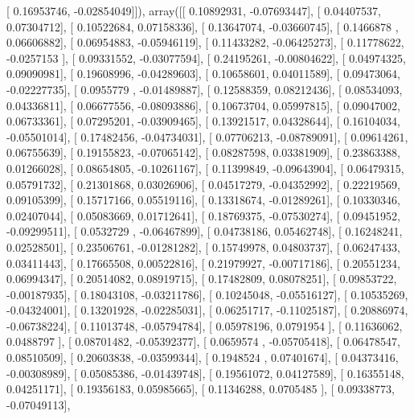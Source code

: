 \documentclass{article}
\begin{document}
       [ 0.16953746, -0.02854049]]), array([[ 0.10892931, -0.07693447],
       [ 0.04407537,  0.07304712],
       [ 0.10522684,  0.07158336],
       [ 0.13647074, -0.03660745],
       [ 0.1466878 ,  0.06606882],
       [ 0.06954883, -0.05946119],
       [ 0.11433282, -0.06425273],
       [ 0.11778622, -0.0257153 ],
       [ 0.09331552, -0.03077594],
       [ 0.24195261, -0.00804622],
       [ 0.04974325,  0.09090981],
       [ 0.19608996, -0.04289603],
       [ 0.10658601,  0.04011589],
       [ 0.09473064, -0.02227735],
       [ 0.0955779 , -0.01489887],
       [ 0.12588359,  0.08212436],
       [ 0.08534093,  0.04336811],
       [ 0.06677556, -0.08093886],
       [ 0.10673704,  0.05997815],
       [ 0.09047002,  0.06733361],
       [ 0.07295201, -0.03909465],
       [ 0.13921517,  0.04328644],
       [ 0.16104034, -0.05501014],
       [ 0.17482456, -0.04734031],
       [ 0.07706213, -0.08789091],
       [ 0.09614261,  0.06755639],
       [ 0.19155823, -0.07065142],
       [ 0.08287598,  0.03381909],
       [ 0.23863388,  0.01266028],
       [ 0.08654805, -0.10261167],
       [ 0.11399849, -0.09643904],
       [ 0.06479315,  0.05791732],
       [ 0.21301868,  0.03026906],
       [ 0.04517279, -0.04352992],
       [ 0.22219569,  0.09105399],
       [ 0.15717166,  0.05519116],
       [ 0.13318674, -0.01289261],
       [ 0.10330346,  0.02407044],
       [ 0.05083669,  0.01712641],
       [ 0.18769375, -0.07530274],
       [ 0.09451952, -0.09299511],
       [ 0.0532729 , -0.06467899],
       [ 0.04738186,  0.05462748],
       [ 0.16248241,  0.02528501],
       [ 0.23506761, -0.01281282],
       [ 0.15749978,  0.04803737],
       [ 0.06247433,  0.03411443],
       [ 0.17665508,  0.00522816],
       [ 0.21979927, -0.00717186],
       [ 0.20551234,  0.06994347],
       [ 0.20514082,  0.08919715],
       [ 0.17482809,  0.08078251],
       [ 0.09853722, -0.00187935],
       [ 0.18043108, -0.03211786],
       [ 0.10245048, -0.05516127],
       [ 0.10535269, -0.04324001],
       [ 0.13201928, -0.02285031],
       [ 0.06251717, -0.11025187],
       [ 0.20886974, -0.06738224],
       [ 0.11013748, -0.05794784],
       [ 0.05978196,  0.0791954 ],
       [ 0.11636062,  0.0488797 ],
       [ 0.08701482, -0.05392377],
       [ 0.0659574 , -0.05705418],
       [ 0.06478547,  0.08510509],
       [ 0.20603838, -0.03599344],
       [ 0.1948524 ,  0.07401674],
       [ 0.04373416, -0.00308989],
       [ 0.05085386, -0.01439748],
       [ 0.19561072,  0.04127589],
       [ 0.16355148,  0.04251171],
       [ 0.19356183,  0.05985665],
       [ 0.11346288,  0.0705485 ],
       [ 0.09338773, -0.07049113],
\end{document}
